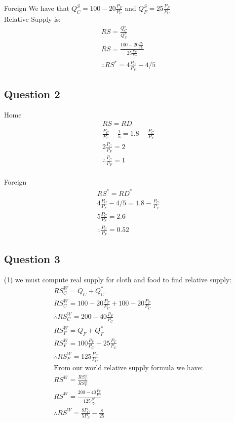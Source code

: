 \documentclass{article}
\begin{document}
Foreign
We have that $Q_{C}^{S} = 100 - 20 \frac{P_{F}}{P_{C}}$ and $Q_{F}^{S} = 25 \frac{P_{F}}{P_{C}}$ \\
Relative Supply is:
\begin{gather*}
  RS = \frac{Q_{C}^{s}}{Q^{s}_{F}} \\
  RS = \frac{100 - 20 \frac{P_{F}}{P_{C}}}{25 \frac{P_{F}}{P_{C}}} \\
  \therefore RS^{*} = 4 \frac{P_{C}}{P_{F}} - 4/5
\end{gather*}

\par \vspace{0.8em}
\subsection{Question 2}

Home
\begin{gather*}
  RS = RD \\
  \frac{P_{C}}{P_{F}} - \frac{1}{5} = 1.8 - \frac{P_{C}}{P_{F}} \\
  2 \frac{P_{C}}{P_{F}} = 2 \\
  \therefore \frac{P_{C}}{P_{F}} = 1  \\
\end{gather*}

Foreign
\begin{gather*}
  RS^{*} = RD^{*} \\
  4 \frac{P_{C}}{P_{F}} - 4/5 = 1.8 - \frac{P_{C}}{P_{F}} \\
  5  \frac{P_{C}}{P_{F}} = 2.6 \\
  \therefore \frac{P_{C}}{P_{F}} = 0.52
\end{gather*}

\par \vspace{0.8em}
\subsection{Question 3}

(1) we must compute real supply for cloth and food to find relative supply:
\begin{gather*}
  RS_{C}^{W} = Q_{C} + Q_{C}^{*} \\
  RS_{C}^{W} = 100 - 20 \frac{P_{F}}{P_{C}} + 100 - 20 \frac{P_{F}}{P_{C}} \\
  \therefore RS_{C}^{W} = 200 - 40 \frac{P_{F}}{P_{C}} \\
  RS_{F}^{W} = Q_{F} + Q_{F}^{*} \\
  RS_{F}^{W} = 100 \frac{P_{F}}{P_{C}} + 25 \frac{P_{F}}{P_{C}} \\
  \therefore RS_{F}^{W} = 125 \frac{P_{F}}{P_{C}} \\
  \text{From our world relative supply formula we have:} \\
  RS^{W} = \frac{RS^{w}_{C}}{RS_{F}^{w}} \\
  RS^{W} = \frac{200 - 40 \frac{P_{F}}{P_{C}}}{125 \frac{P^{F}}{P_{C}}} \\
  \therefore RS^{W} = \frac{8P_{C}}{5P_{F}} - \frac{8}{25} \\
\end{gather*}
\end{document}
